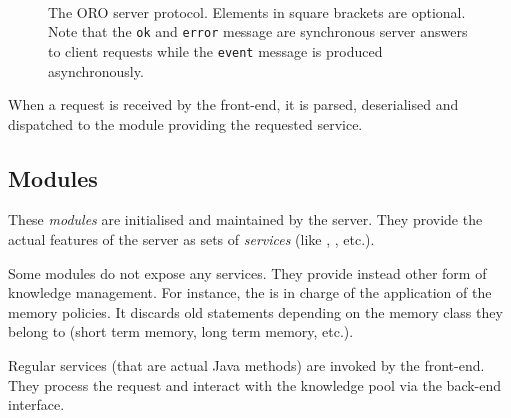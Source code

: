 \begin{figure}
\centering
\footnotesize
{} \\

\caption{The ORO server protocol. Elements in square brackets are optional.
Note that the {\tt ok} and {\tt error} message are synchronous server answers
to client requests while the {\tt event} message is produced asynchronously.}

\label{fig|oro-protocol}

\end{figure}


When a request is received by the front-end, it is parsed, deserialised and
dispatched to the module providing the requested service.

\subsection{Modules}

These \emph{modules} are initialised and maintained by the server. They provide
the actual features of the server as sets of \emph{services} (like ,
, etc.).

Some modules do not expose any services. They provide instead other form of
knowledge management. For instance, the  is in charge of
the application of the memory policies. It discards old statements depending on
the memory class they belong to (short term memory, long term memory, etc.).

Regular services (\ie that are actual Java methods) are invoked by the
front-end.  They process the request and interact with the knowledge pool via
the back-end interface.

